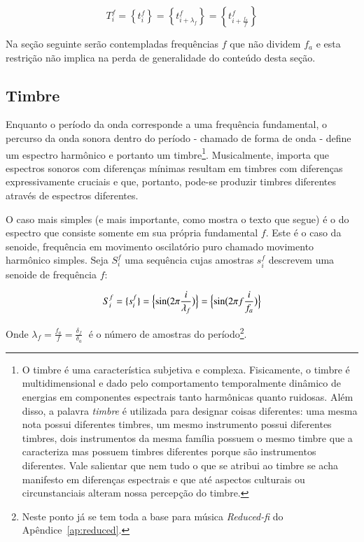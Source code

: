 \begin{equation}\label{periodicidade}
     T^f_i=\left\{ t_i^f \right\}=\left\{ t^f_{i+\lambda_{f}}  \right\}= \left\{ t^f_{i+\frac{f_a}{f}} \right\}
\end{equation}

Na seção seguinte serão contempladas frequências $f$ que não dividem $f_a$ e esta restrição não implica na perda de generalidade do conteúdo desta seção.

\subsection{Timbre}
Enquanto o período da onda corresponde a uma frequência fundamental, o percurso
da onda sonora dentro do período - chamado de forma de onda - define um espectro harmônico e portanto
um timbre\footnote{O timbre é uma característica subjetiva e complexa. Fisicamente,
o timbre é multidimensional e dado pelo comportamento temporalmente dinâmico
de energias em componentes espectrais tanto harmônicas quanto ruidosas.
Além disso, a palavra \emph{timbre} é utilizada para designar coisas diferentes: uma mesma nota
possui diferentes timbres, um mesmo instrumento possui diferentes timbres, dois instrumentos da mesma família possuem o mesmo timbre que a caracteriza mas possuem timbres diferentes porque são instrumentos diferentes.
  Vale salientar que nem tudo
o que se atribui ao timbre se acha manifesto em diferenças espectrais e que até
aspectos culturais ou circunstanciais alteram nossa percepção do timbre.
}. Musicalmente, importa que espectros sonoros com diferenças mínimas resultam em timbres com diferenças expressivamente cruciais e que, portanto, pode-se produzir timbres diferentes através de espectros diferentes.\cite{Roederer}


O caso mais simples (e mais importante, como mostra o texto que segue) é o do espectro que consiste somente
em sua própria fundamental $f$. Este é o caso da senoide, frequência em movimento oscilatório puro chamado
movimento harmônico simples. Seja $S_i^f$ uma sequência cujas amostras
$s_i^f$ descrevem uma senoide de frequência $f$:

\begin{equation}\label{senoide}
     S^f_i=\{ s^f_i \}=\Bigl\{ \sin\bigl(2\pi \frac{i}{\lambda_f} \bigr)  \Bigr\} = \Bigl\{ \sin\bigl(2\pi f \frac{i}{f_a}\bigr)  \Bigr\} 
\end{equation}

Onde $\lambda_f=\frac{f_a}{f}=\frac{\delta_f}{\delta_a} \;$ é o número de amostras do período\footnote{Neste ponto já se tem toda a base para música \emph{Reduced-fi} do Apêndice~\ref{ap:reduced}.}.


